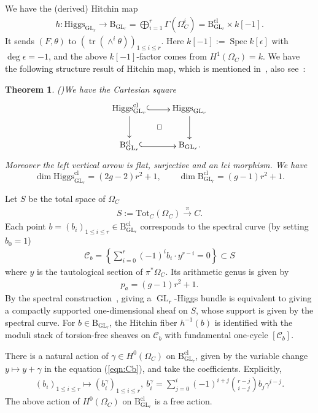 \documentclass[11pt,oneside,a4paper,mathscr]{amsart}
\makeatletter
\newtheorem{thm}{Theorem}[section]
\theoremstyle{definition}
\renewcommand{\leq}{\leqslant}
\newcommand{\tr}{\operatorname{\mathrm{tr}}}
\newcommand{\cC}{\mathcal{C}}
\newcommand{\diasquare}{\ar@{}[rd]|\square}
\newcommand{\rB}{\mathrm{B}}
\newcommand{\Spec}{\operatorname{Spec}}
\newcommand{\GL}{\operatorname{GL}}
\newcommand{\inclusion}{\ar@<-0.3ex>@{^{(}->}[r]}
\newcommand{\Hig}{\mathrm{Higgs}}
\makeatother
\begin{document}
We have the (derived) Hitchin map 
\begin{align*}
   h \colon \Hig_{\GL_r} \to \mathrm{B}_{\GL_r}=\bigoplus_{i=1}^r \Gamma(\Omega_C^i)=\mathrm{B}_{\GL_r}^{\mathrm{cl}}\times k[-1].
\end{align*}
It sends $(F, \theta)$ to $(\tr(\wedge^i \theta))_{1\leq i\leq r}$.
Here 
$k[-1]:=\Spec k[\epsilon]$ with $\deg \epsilon=-1$, and the above 
$k[-1]$-factor comes from $H^1(\Omega_C)=k$. 
We have the following structure result of Hitchin map, 
which is mentioned in~\cite[Theorem~2.2.4]{BD0}, also see~\cite[Theorem~2.1]{TodaGL2}: 
\begin{thm}\emph{(\cite{Hitchin, Faltings1993, Ginzburg2001})}\label{thm:higgs:basic}
We have the Cartesian square
\begin{align}\label{dia:HigB}
    \xymatrix{
\Hig_{\GL_r}^{\mathrm{cl}} \inclusion \ar[d] \diasquare & \Hig_{\GL_r} \ar[d] \\
\rB_{\GL_r}^{\mathrm{cl}} \inclusion & \rB_{\GL_r}.
    }
\end{align}
Moreover the left vertical arrow is flat, surjective and an lci morphism. We have
\[
\dim \Hig_{\GL_r}^{\mathrm{cl}}=(2g-2)r^2+1,\qquad
\dim \rB_{\GL_r}^{\mathrm{cl}}=(g-1)r^2+1 .
\]
\end{thm}


Let $S$ be the total space of $\Omega_C$
\begin{align*}
    S:=\mathrm{Tot}_C(\Omega_C) \stackrel{\pi}{\to} C.
\end{align*}
Each point $b=(b_i)_{1\leq i\leq r}\in \rB_{\GL_r}^{\mathrm{cl}}$ corresponds to the 
spectral curve (by setting $b_0=1$)
\begin{align}\label{eqn:Cb}
    \cC_b=\left\{\sum_{i=0}^r (-1)^{i} b_{i} \cdot y^{r-i}=0\right\} \subset S
\end{align}
where $y$ is the tautological section of $\pi^* \Omega_C$. 
Its arithmetic genus is given by 
\begin{align}\label{def:pa}
    p_a=(g-1)r^2+1.
\end{align}
By the spectral construction~\cite{BeNaRa}, 
giving a $\GL_r$-Higgs bundle is equivalent to giving a 
compactly supported one-dimensional sheaf on $S$, whose support is given 
by the spectral curve. 
For $b\in \rB_{\GL_r}$, 
the Hitchin fiber 
$h^{-1}(b)$ is identified with the moduli stack of torsion-free 
sheaves on $\cC_b$
with fundamental one-cycle $[\cC_b]$. 

There is a natural action of $\gamma \in H^0(\Omega_C)$ on $\rB_{\GL_r}^{\mathrm{cl}}$, given by the variable change $y\mapsto y+\gamma$ 
in the equation (\ref{eqn:Cb}), and take the coefficients. Explicitly, 
\begin{align}\label{act:gamma}
    (b_i)_{1\leq i\leq r} \mapsto 
     (b_i^{\gamma})_{1\leq i\leq r}, \ 
b_i^\gamma
=
\sum_{j=0}^i
(-1)^{i+j}
\binom{r-j}{i-j}
b_j \gamma^{i-j}.
\end{align}
The above action of $H^0(\Omega_C)$ on $\rB_{\GL_r}^{\mathrm{cl}}$ is a free action. 
\end{document}
